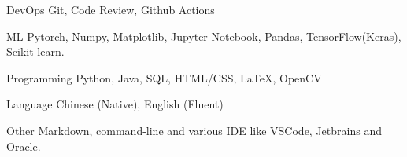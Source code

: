

\begin{cvskills}

  \cvskill
    {DevOps} %
    {Git, Code Review, Github Actions} %


  \cvskill
    {ML} %
    {Pytorch, Numpy, Matplotlib, Jupyter Notebook, Pandas, TensorFlow(Keras), Scikit-learn.} %

  \cvskill
    {Programming} %
    {Python, Java, SQL, HTML/CSS, LaTeX, OpenCV} %

  \cvskill
    {Language} %
    {Chinese (Native), English (Fluent)} %

  \cvskill
    {Other} %
    {Markdown, command-line and various IDE like VSCode, Jetbrains and Oracle.} %

\end{cvskills}
